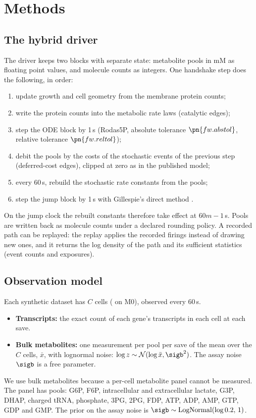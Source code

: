 \section{Methods}
\label{sec:methods}

\subsection{The hybrid driver}
\label{sec:driver}

The driver keeps two blocks with separate state: metabolite pools in mM as floating
point values, and molecule counts as integers. One handshake step does the
following, in order:
\begin{enumerate}
  \item update growth and cell geometry from the membrane protein counts;
  \item write the protein counts into the metabolic rate laws (catalytic edges);
  \item step the ODE block by 1\,s (Rodas5P, absolute tolerance $\pn{fw.abstol}$, relative
  tolerance $\pn{fw.reltol}$);
  \item debit the pools by the costs of the stochastic events of the previous step
  (deferred-cost edges), clipped at zero as in the published model;
  \item every 60\,s, rebuild the stochastic rate constants from the pools;
  \item step the jump block by 1\,s with Gillespie's direct method
  \cite{gillespie1977exact}.
\end{enumerate}
On the jump clock the rebuilt constants therefore take effect at $60m - 1$\,s. Pools
are written back as molecule counts under a declared rounding policy. A recorded path
can be replayed: the replay applies the recorded firings instead of drawing new ones,
and it returns the log density of the path and its sufficient statistics (event
counts and exposures).

\subsection{Observation model}
\label{sec:obs}

Each synthetic dataset has $C$ cells ( on M0), observed every 60\,s.
\begin{itemize}
  \item \textbf{Transcripts:} the exact count of each gene's transcripts in each cell
  at each save.
  \item \textbf{Bulk metabolites:} one measurement per pool per save of the mean over
  the $C$ cells, $\bar{x}$, with lognormal noise: $\log z \sim
  \mathcal{N}(\log \bar{x}, \sigb^2)$. The assay noise $\sigb$ is a free parameter.
\end{itemize}
We use bulk metabolites because a per-cell metabolite panel cannot be measured.
The panel has  pools: G6P, F6P, intracellular and extracellular
lactate, G3P, DHAP, charged tRNA, phosphate, 3PG, 2PG, FDP, ATP, ADP, AMP, GTP, GDP and
GMP. The prior on the assay noise is $\sigb \sim \mathrm{LogNormal}(\log 0.2,\, 1)$.

